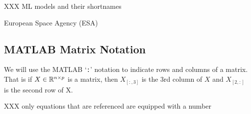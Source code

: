 XXX ML models and their shortnames

European Space Agency (ESA)

\subsection*{MATLAB Matrix Notation}{ \label{sec:MATLAB}
		We will use the MATLAB `\texttt{:}' notation to indicate rows and columns of a matrix. That is if $X\in\mathbb{R}^{n\times p}$ is a matrix, then $X_{[:,3]}$ is the $3$rd column of $X$ and $X_{[2,:]}$ is the second row of X. 
}

XXX only equations that are referenced are equipped with a number

